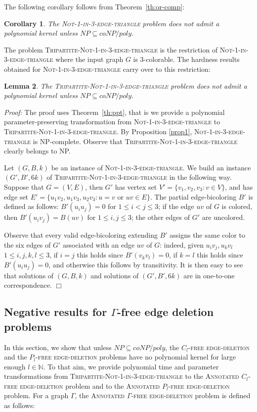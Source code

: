 \documentclass[11pt]{article}
\newenvironment{proof}{\noindent\textit{Proof: }}{{\hfill $\Box$}}
\newtheorem{lemma}{Lemma}[section]
\newtheorem{corollary}[lemma]{Corollary}
\newcommand{\gbc}{\textsc{Not-1-in-3-edge-triangle}}
\newcommand{\tgbc}{\textsc{Tripartite-Not-1-in-3-edge-triangle}}
\newcommand{\hyp}{NP \subseteq coNP / poly}
\begin{document}
The following corollary follows from Theorem~\ref{th:or-comp}:

\begin{corollary}
The \gbc{} problem does not admit a polynomial kernel unless $NP\subseteq coNP/poly$.
\end{corollary}

The problem \tgbc{} is the restriction of \gbc{} where the input graph $G$ is 3-colorable. The hardness results obtained for \gbc{} carry over to this restriction:

\begin{lemma} \label{prop2} 
The \tgbc{} problem  does not admit a polynomial kernel unless $\hyp$.
\end{lemma}

\begin{proof}
The proof uses Theorem~\ref{th:ppt}, that is we provide a polynomial parameter-preserving transformation from \gbc{} to \tgbc{}. By Proposition \ref{prop1}, \gbc{} is NP-complete. Observe that \tgbc{} clearly belongs to NP.

Let $(G,B,k)$ be an instance of \gbc{}. We build an instance $(G',B',6k)$ of \tgbc{} in the following way. Suppose that $G = (V,E)$, then $G'$ has vertex set $V' = \{ v_1,v_2,v_3 : v \in V \}$, and has edge set $E' = \{ u_1 v_2, u_1 v_3, u_2 v_3 : u = v \text{ or } u v \in E \}$. The partial edge-bicoloring $B'$ is defined as follows: $B'(u_iu_j)=0$ for $1\leqslant i<j\leqslant 3$; if the edge $uv$ of $G$ is colored, then $B'(u_iv_j)=B(uv)$ for $1\leqslant i,j\leqslant 3$; the other edges of $G'$ are uncolored.

Observe that every valid edge-bicoloring extending $B'$ assigns the same color to the six edges of $G'$ associated with an edge $uv$ of $G$: indeed, given $u_i v_j, u_k v_l$ $1\leqslant i,j,k,l\leqslant 3$, if $i= j$ this holds since $B'(v_k v_l) = 0$, if $k = l$ this holds since $B'(u_i u_j) = 0$, and otherwise this follows by transitivity. It is then easy to see that solutions of $(G,B,k)$ and solutions of $(G',B',6k)$ are in one-to-one correspondence. 
\end{proof}

\subsection{Negative results for $\Gamma$-free edge deletion problems}

In this section, we show that unless $NP \subseteq coNP / poly$, the \textsc{$C_l$-free edge-deletion} and the \textsc{$P_l$-free edge-deletion} problems have no polynomial kernel for large enough $l\in\mathbb{N}$. To that aim, we provide polynomial time and parameter transformations from \tgbc{} to the \textsc{Annotated $C_l$-free edge-deletion} problem and to the \textsc{Annotated $P_l$-free edge-deletion} problem. For a graph $\Gamma$, the \textsc{Annotated $\Gamma$-free edge-deletion} problem is defined as follows:\\
\end{document}
